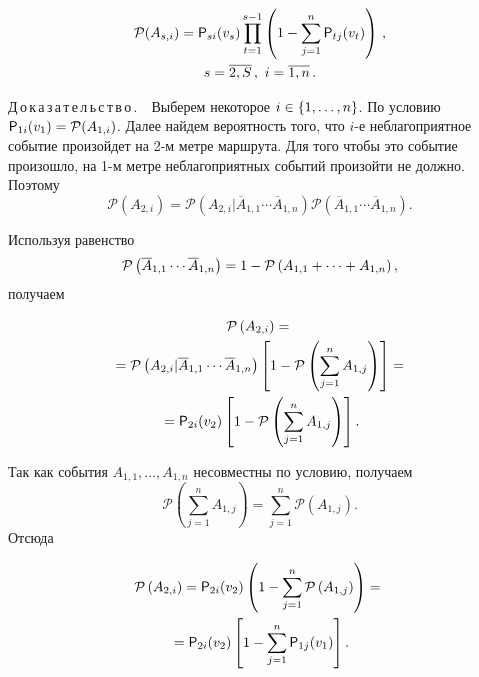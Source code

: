 \begin{multicols}{2}
\noindent
\begin{multline*}
\mathcal{P}(A_{s,i})= {\sf P}_{si}(v_s)\prod\limits^{s-1}_{t=1} \left( 1-
\sum\limits^n_{j=1} {\sf P}_{tj}(v_t)\right)\,,\\
s=\overline{2,S}\,,\ i=\overline{1,n}\,.
\end{multline*}
     
     \noindent
     Д\,о\,к\,а\,з\,а\,т\,е\,л\,ь\,с\,т\,в\,о\,.\ \  Выберем некоторое $i\hm\in \{ 1, \ldots , n \}$. 
     По условию ${\sf P}_{1i} (v_1)\hm= \mathcal{P}(A_{1,i})$. Далее найдем 
ве\-ро\-ят\-ность того, что $i$-е неблагоприятное событие произойдет на 2-м мет\-ре 
маршрута. Для того чтобы это событие произошло, на 1-м мет\-ре 
неблагоприятных событий произойти не долж\-но. Поэтому 
     $$
     \mathcal{P}(A_{2,i})=\mathcal{P}\left( A_{2,i}\vert \overline{A}_{1,1} \cdots 
\overline{A}_{1,n}\right) \mathcal{P}\left( \overline{A}_{1,1}\cdots 
\overline{A}_{1,n}\right).
     $$
     
     Используя равенство 
     $$
     \mathcal{P}\left( \overline{A}_{1,1}\cdots 
\overline{A}_{1,n}\right) \hm= 1\hm- \mathcal{P}\left( A_{1,1}+\cdots+ 
A_{1,n}\right),
$$
 получаем 
 
 \vspace*{-4pt}
 
 \noindent
     \begin{multline*}
     \mathcal{P}\left( A_{2,i}\right) ={}\\
     {}=\mathcal{P}\left( A_{2,i}\vert 
\overline{A}_{1,1} \cdots \overline{A}_{1,n}\right) \left[ 1-\mathcal{P}\left( 
\sum\limits^n_{j=1} A_{1,j}\right)\right] ={}\\
{}={\sf P}_{2i}(v_2) \left[ 1-\mathcal{P}\left( 
\sum\limits^n_{j=1} A_{1,j}\right)\right].
     \end{multline*}
     
     Так как события $A_{1,1},\ldots , A_{1,n}$ несовместны по условию, 
получаем 
$$
\mathcal{P}\left( \sum\limits^n_{j=1}A_{1,j}\right) = 
\sum\limits^n_{j=1} \mathcal{P} \left( A_{1,j}\right).
$$
 Отсюда 
 
 \vspace*{-4pt}
 
 \noindent
\begin{multline*}
     \mathcal{P}\left( A_{2,i}\right) ={\sf P}_{2i} (v_2) \left( 1-\sum\limits^n_{j=1} 
\mathcal{P}\left( A_{1,j}\right)\right) ={}\\
{}={\sf P}_{2i}(v_2)\left[ 1-\sum\limits^n_{j=1} 
{\sf P}_{1j}(v_1)\right].
\end{multline*}
     

\end{multicols}
